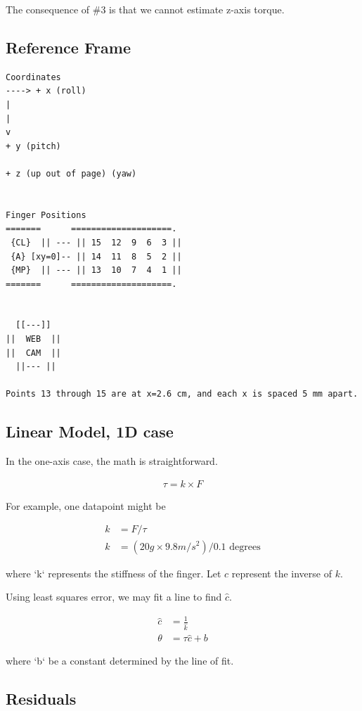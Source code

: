 \documentclass[12pt]{article}
\begin{document}
The consequence of \#3 is that we cannot estimate z-axis torque.

\subsection{Reference Frame}

\begin{lstlisting}
Coordinates
----> + x (roll)
|
|
v
+ y (pitch)

+ z (up out of page) (yaw)


Finger Positions
=======      ====================.
 {CL}  || --- || 15  12  9  6  3 ||
 {A} [xy=0]-- || 14  11  8  5  2 ||
 {MP}  || --- || 13  10  7  4  1 ||
=======      ====================.


  [[---]]
||  WEB  ||
||  CAM  ||
  ||--- ||
  
Points 13 through 15 are at x=2.6 cm, and each x is spaced 5 mm apart.
\end{lstlisting}

\subsection{Linear Model, 1D case}

In the one-axis case, the math is straightforward.

\begin{align}
\tau = k \times F
\end{align}

For example, one datapoint might be

\begin{align}
k &= F / \tau \\
k &= (20g \times 9.8 m/s^2)/0.1 \text{ degrees}
\end{align}

where `k` represents the stiffness of the finger. Let $c$ represent the inverse of $k$.

Using least squares error, we may fit a line to find $\hat{c}$. 

\begin{align}
 \hat{c} &= \frac{1}{\hat{k}} \\
 \theta &= \tau \hat{c} + b
\end{align}

where `b` be a constant determined by the line of fit.

\subsection{Residuals}
\end{document}
